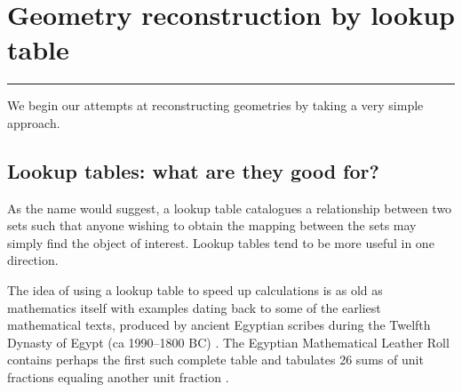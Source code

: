 \chapter{Geometry reconstruction by lookup table}\label{ch:lookupTable}

\vspace{-1.5 em}
\minitoc\hrule
\vspace{1.5 em}

\noindent
We begin our attempts at reconstructing geometries by taking a very simple approach.

\section{Lookup tables: what are they good for?}
As the name would suggest, a lookup table catalogues a relationship between two sets such that anyone wishing to obtain the mapping between the sets may simply find the object of interest. Lookup tables tend to be more useful in one direction.

%
The idea of using a lookup table to speed up calculations is as old as mathematics itself with examples dating back to some of the earliest mathematical texts, produced by ancient Egyptian scribes during the Twelfth Dynasty of Egypt (ca 1990--1800 BC) \citep[p. 1, footnote 4]{Neugebauer45}. The Egyptian Mathematical Leather Roll contains perhaps the first such complete table and tabulates 26 sums of unit fractions equaling another unit fraction \citep{Glanville27}.

